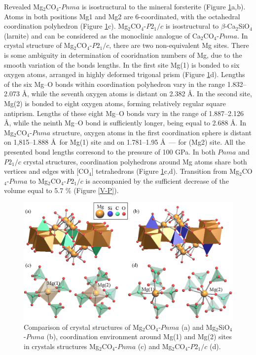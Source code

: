 \documentclass[a4paperm]{article}
\begin{document}
Revealed Mg$_2$CO$_4$-$Pnma$ is isostructural to the mineral forsterite (Figure \ref{str}a,b).
Atoms in both positions Mg1 and Mg2 are 6-coordinated, with the octahedral coordination polyhedron (Figure \ref{str}c). 
Mg$_2$CO$_4$-$P2_1/c$ is isostructural to $\beta$-Ca$_2$SiO$_4$ (larnite) and can be considered as the monoclinic analogue of Ca$_2$CO$_4$-$Pnma$.
In crystal structure of Mg$_2$CO$_4$-$P2_1/c$, there are two non-equivalent Mg sites.
There is some ambiguity in determination of cooridnation numbers of Mg, due to the smooth variation of the bonds lengths.
In the first site Mg(1) is bonded to six oxygen atoms, arranged in highly deformed trigonal prism  (Figure \ref{str}d).
Lengths of the six Mg--O bonds within coordination polyhedron vary in the range 1.832--2.073 \AA, while the seventh oxygen atoms is distant on 2.382 \AA.
In the second site, Mg(2) is bonded to eight oxygen atoms, forming relatively regular square antiprism.
Lengths of these eight Mg--O bonds vary in the range of 1.887--2.126 \AA, while the neinth Mg--O bond is sufficiently longer, being equal to 2.688 \AA.
In Mg$_2$CO$_4$-$Pnma$ structure, oxygen atoms in the first coordination sphere is distant on 1,815--1.888 \AA\ for Mg(1) site and on 1.781--1.95 \AA\ --- for (Mg2) site.
All the presented bond lengths corresond to the pressure of 100 GPa.
In both $Pnma$ and $P2_1/c$ crystal structures, coordination polyhedrons around Mg atoms share both vertices and edges with [CO$_4$] tetrahedrons (Figure \ref{str}c,d).
Transition from Mg$_2$CO$_4$-$Pnma$ to Mg$_2$CO$_4$-$P2_1/c$ is accompanied by the sufficient decrease of the volume equal to 5.7 \% (Figure \ref{V-P}).

\begin{figure}[H]
	\includegraphics[width=\textwidth]{mg2co4_str} \centering
	\caption{Comparison of crystal structures of Mg$_2$CO$_4$-$Pnma$ (a) and Mg$_2$SiO$_4$-$Pnma$ (b), coordination environment around Mg(1) and Mg(2) sites in crystals structures Mg$_2$CO$_4$-$Pnma$ (c) and Mg$_2$CO$_4$-$P2_1/c$ (d).} 	\label{str}
\end{figure}
\end{document}
